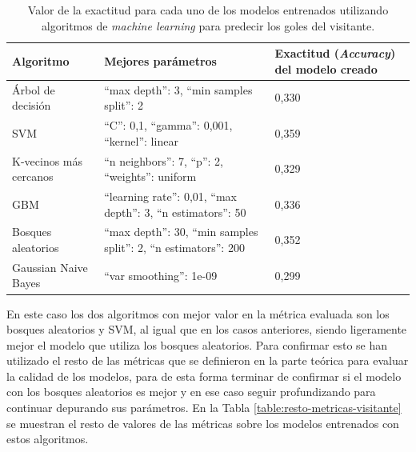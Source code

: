 \begin{table}[]
    \centering
    \begin{tabularx}{\textwidth}{|l|>{\raggedright\arraybackslash}X|l|}
        \hline
        \rowcolor[HTML]{C0C0C0}
        Algoritmo              & Mejores parámetros                                     & Exactitud (\textit{Accuracy}) del modelo creado \\ \hline
        Árbol de decisión      & ``max depth'': 3, ``min samples split'': 2                     & 0,330                                  \\ \hline
        SVM                    & ``C'': 0,1, ``gamma'': 0,001, ``kernel'': linear                   & 0,359                                  \\ \hline
        K-vecinos más cercanos & ``n neighbors'': 7, ``p'': 2, ``weights'': uniform                 & 0,329                                  \\ \hline
        GBM                    & ``learning rate'': 0,01, ``max depth'': 3, ``n estimators'': 50    & 0,336                                  \\ \hline
        Bosques aleatorios     & ``max depth'': 30, ``min samples split'': 2, ``n estimators'': 200 & 0,352                                  \\ \hline
        Gaussian Naive Bayes   & ``var smoothing'': 1e-09                                   & 0,299                                  \\ \hline
    \end{tabularx}
    \caption{Valor de la exactitud para cada uno de los modelos entrenados utilizando algoritmos de \textit{machine learning} para predecir los goles del visitante.}
    \label{table:exactitud-visitante}
\end{table}


En este caso los dos algoritmos con mejor valor en la métrica evaluada son los bosques aleatorios y SVM, al igual que en los casos anteriores, siendo ligeramente mejor el modelo que utiliza los bosques aleatorios. Para confirmar esto se han utilizado el resto de las métricas que se definieron en la parte teórica para evaluar la calidad de los modelos, para de esta forma terminar de confirmar si el modelo con los bosques aleatorios es mejor y en ese caso seguir profundizando para continuar depurando sus parámetros. En la Tabla \ref{table:resto-metricas-visitante} se muestran el resto de valores de las métricas sobre los modelos entrenados con estos algoritmos.

